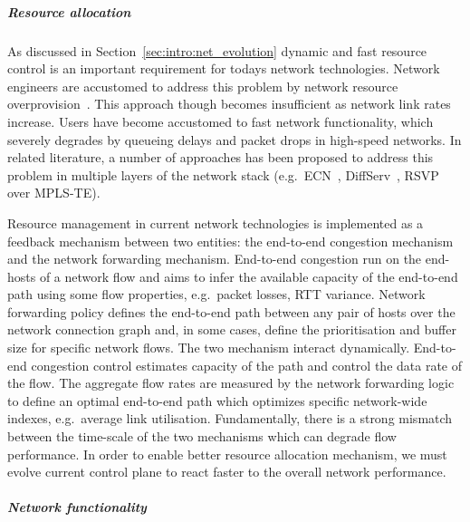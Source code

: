 \subparagraph*{Resource allocation} 
As discussed in Section~\ref{sec:intro:net_evolution} dynamic and fast resource
control is an important requirement for todays network technologies.  Network
engineers are accustomed to address this problem by network resource
overprovision~\cite{TeiSha02}. This approach though becomes insufficient as
network link rates increase. Users have become accustomed to fast network
functionality, which severely degrades by queueing delays and
packet drops in high-speed networks. In related literature, a number of
approaches has been proposed to address this problem in multiple layers of the
network stack (e.g.~ECN~\cite{RFC5562}, DiffServ~\cite{RFC2475}, RSVP over
MPLS-TE\cite{RFC3209}). 

Resource management in current network technologies is implemented as a feedback
mechanism between two entities: the end-to-end congestion mechanism and the
network forwarding mechanism. End-to-end congestion run on the end-hosts of a
network flow and aims to infer the available capacity of the end-to-end path
using some flow properties, e.g.~packet losses, RTT variance. Network forwarding
policy defines the end-to-end path between any pair of hosts over the network
connection graph and, in some cases, define the prioritisation and buffer size
for specific network flows. The two mechanism interact dynamically. End-to-end
congestion control estimates capacity of the path and control the data rate of
the flow. The aggregate flow rates are measured by the network forwarding logic
to define an optimal end-to-end path which optimizes specific network-wide
indexes, e.g.~average link utilisation. Fundamentally, there is a strong
mismatch between the time-scale of the two mechanisms which can degrade flow
performance. In order to enable better resource allocation mechanism, we must
evolve current control plane to react faster to the overall network performance. 

\subparagraph*{Network functionality} 

